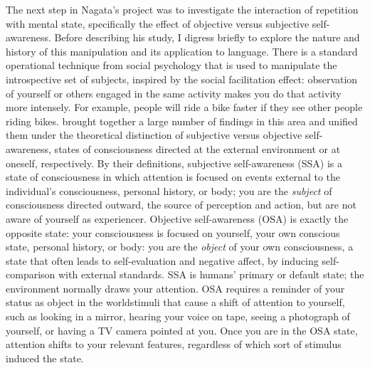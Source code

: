 The next step in Nagata's project was to investigate the interaction of repetition with mental state, specifically the effect of objective versus subjective self-awareness. Before describing his study, I digress briefly to explore the nature and history of this manipulation and its application to language. There is a standard operational technique from social psychology that is used to manipulate the introspective set of subjects, inspired by the social facilitation effect: observation of yourself or others engaged in the same activity makes you do that activity more intensely. For example, people will ride a bike faster  if they see other people riding bikes. \citet{DuvalEtAl1972} brought together a large number of findings in this area and unified them under the theoretical distinction of subjective versus objective self-awareness, states of consciousness directed at the external environment or at oneself, respectively. By their definitions, subjective self-awareness (SSA) is a state of consciousness in which attention is focused on events external to the individual's consciousness, personal history, or body; you are the \textit{subject} of consciousness directed outward, the source of perception and action, but are not aware of yourself as experiencer. Objective self-awareness (OSA) is exactly the opposite state: your consciousness is focused on yourself, your own conscious state, personal history, or body: you are the \textit{object} of your own consciousness, a state that often leads to self-evaluation and negative affect, by inducing self-comparison with external standards. SSA is humans' primary or default state; the environment normally draws your attention. OSA requires a reminder of your status as object in the world\schdash{}stimuli that cause a shift of attention to yourself, such as looking in a mirror, hearing your voice on tape, seeing a photograph of yourself, or having a TV camera pointed at you. Once you are in the OSA state, attention shifts to your relevant features, regardless of which sort of stimulus induced the state.

